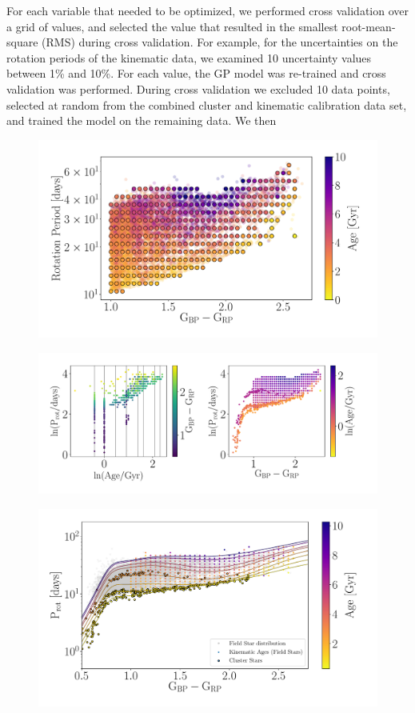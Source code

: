 For each variable that needed to be optimized, we performed cross validation
over a grid of values, and selected the value that resulted in the smallest
root-mean-square (RMS) during cross validation.
For example, for the uncertainties on the rotation periods of the kinematic
data, we examined 10 uncertainty values between 1\% and 10\%.
For each value, the GP model was re-trained and cross validation was
performed.
During cross validation we excluded 10 data points, selected at random from
the combined cluster and kinematic calibration data set, and trained the model
on the remaining data.
We then

\begin{figure}
\caption{
}
  \centering \includegraphics[width=1\textwidth]{grid_points}
    \label{fig:grid_points}
\end{figure}

\begin{figure}
\caption{
}
  \centering \includegraphics[width=1\textwidth]{gp_fit_data_multi-panel}
\end{figure}

\begin{figure}
\caption{
}
  \centering \includegraphics[width=1\textwidth]{gp_fit}
\end{figure}
